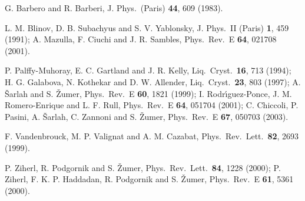 \documentclass[aps,pre,twocolumn,groupedaddress,showpacs]{revtex4}
\begin{document}
\begin{thebibliography}{99}
 G. Barbero and R. Barberi, J. Phys.\ (Paris)
{\bf 44}, 609 (1983).

 L. M. Blinov, D. B. Subachyus and S. V. Yablonsky,
J. Phys.\ II (Paris) {\bf 1}, 459 (1991); A. Mazulla, F. Ciuchi and J. R. 
Sambles, Phys.\ Rev.\ E {\bf 64}, 021708 (2001).

 P. Palffy-Muhoray, E. C. Gartland and J. R. Kelly,
Liq.\ Cryst.\ {\bf 16}, 713 (1994); H. G. Galabova, N. Kothekar and D. W.
Allender, Liq.\ Cryst.\ {\bf 23}, 803 (1997); A. \v{S}arlah and S. \v{Z}umer,
Phys.\ Rev.\ E {\bf 60}, 1821 (1999); I. Rodr\'{\i}guez-Ponce, J. M. 
Romero-Enrique and L. F. Rull, Phys.\ Rev.\ E {\bf 64}, 051704 (2001);
C. Chiccoli, P. Pasini, A. \v{S}arlah, C. Zannoni and S. \v{Z}umer, 
Phys.\ Rev.\ E {\bf 67}, 050703 (2003).

 F. Vandenbrouck, M. P. Valignat and A. M. Cazabat,
Phys.\ Rev.\ Lett.\ {\bf 82}, 2693 (1999). 

 P. Ziherl, R. Podgornik and S. \v{Z}umer,
Phys.\ Rev.\ Lett.\ {\bf 84}, 1228 (2000);
P. Ziherl, F. K. P. Haddadan, R. Podgornik
and S. \v{Z}umer, Phys.\ Rev.\ E {\bf 61}, 5361 (2000).

\end{thebibliography}
\end{document}
